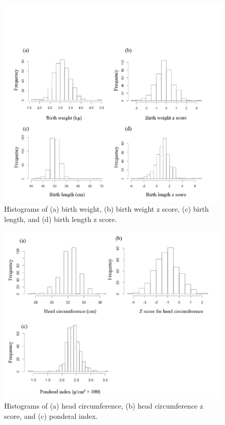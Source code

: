 \begin{figure}
  \centering
    \label{fig:Fig34}
  \includegraphics[scale=1]{Figures/Fig34.pdf}
  \caption[Histograms of (a) birth weight, (b) birth weight z score, (c) birth length, and (d) birth length z score]{Histograms of (a) birth weight, (b) birth weight z score, (c) birth length, and (d) birth length z score.}
\end{figure}

\begin{figure}
  \centering
    \label{fig:Fig35}
  \includegraphics[scale=1]{Figures/Fig35.pdf}
  \caption[Histograms of (a) head circumference, (b) head circumference z score, and (c) ponderal index]{Histograms of (a) head circumference, (b) head circumference z score, and (c) ponderal index.}
\end{figure}

